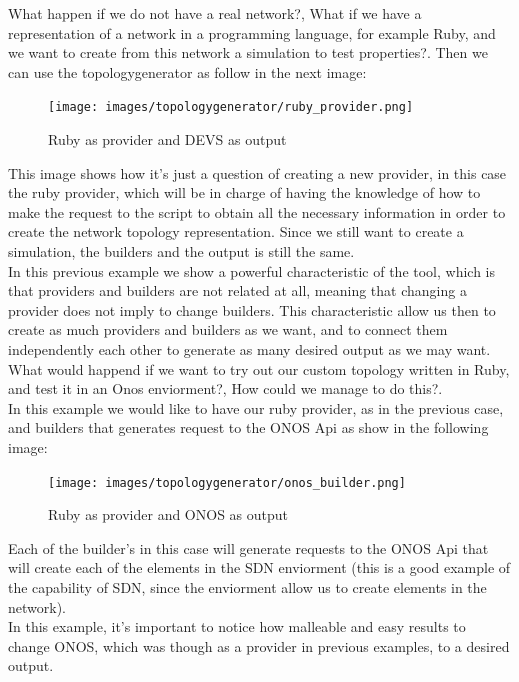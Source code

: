 What happen if we do not have a real network?, What if we have a representation of a network in a programming language, for example Ruby, and we want to create from this network a simulation to test properties?. Then we can use the topologygenerator as follow in the next image:

\begin{figure}[H]
\centering
\texttt{[image: images/topologygenerator/ruby\_provider.png]}
\caption{Ruby as provider and DEVS as output}
\end{figure}
 
This image shows how it's just a question of creating a new provider, in this case the ruby provider, which will be in charge of having the knowledge of how to make the request to the script to obtain all the necessary information in order to create the network topology representation. Since we still want to create a simulation, the builders and the output is still the same. \\

In this previous example we show a powerful characteristic of the tool, which is that providers and builders are not related at all, meaning that changing a provider does not imply to change builders. This characteristic allow us then to create as much providers and builders as we want, and to connect them independently each other to generate as many desired output as we may want. \\

What would happend if we want to try out our custom topology written in Ruby, and test it in an Onos enviorment?, How could we manage to do this?.\\
In this example we would like to have our ruby provider, as in the previous case, and builders that generates request to the ONOS Api as show in the following image:

\begin{figure}[H]
\centering
\texttt{[image: images/topologygenerator/onos\_builder.png]}
\caption{Ruby as provider and ONOS as output}
\end{figure}

Each of the builder's in this case will generate requests to the ONOS Api that will create each of the elements in the SDN enviorment (this is a good example of the capability of SDN, since the enviorment allow us to create elements in the network). \\
In this example, it's important to notice how malleable and easy results to change ONOS, which was though as a provider in previous examples, to a desired output.\\

